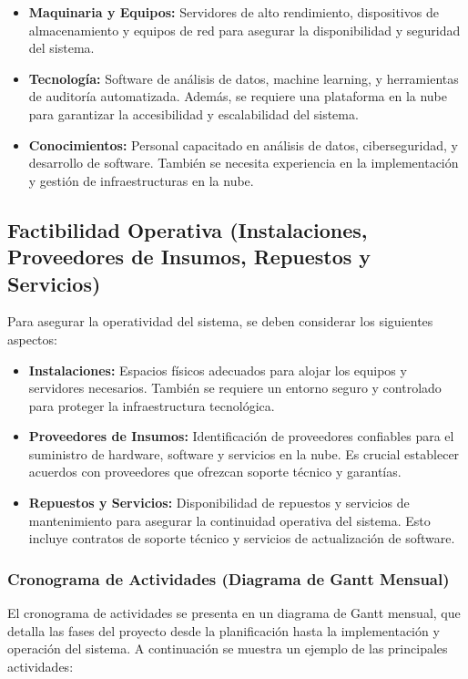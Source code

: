 \documentclass[a4paper,12pt]{article}
\begin{document}
\begin{itemize}
    \item \textbf{Maquinaria y Equipos:} Servidores de alto rendimiento, dispositivos de almacenamiento y equipos de red para asegurar la disponibilidad y seguridad del sistema.
    \item \textbf{Tecnología:} Software de análisis de datos, machine learning, y herramientas de auditoría automatizada. Además, se requiere una plataforma en la nube para garantizar la accesibilidad y escalabilidad del sistema.
    \item \textbf{Conocimientos:} Personal capacitado en análisis de datos, ciberseguridad, y desarrollo de software. También se necesita experiencia en la implementación y gestión de infraestructuras en la nube.
\end{itemize}

\subsection{Factibilidad Operativa (Instalaciones, Proveedores de Insumos, Repuestos y Servicios)}
Para asegurar la operatividad del sistema, se deben considerar los siguientes aspectos:

\begin{itemize}
    \item \textbf{Instalaciones:} Espacios físicos adecuados para alojar los equipos y servidores necesarios. También se requiere un entorno seguro y controlado para proteger la infraestructura tecnológica.
    \item \textbf{Proveedores de Insumos:} Identificación de proveedores confiables para el suministro de hardware, software y servicios en la nube. Es crucial establecer acuerdos con proveedores que ofrezcan soporte técnico y garantías.
    \item \textbf{Repuestos y Servicios:} Disponibilidad de repuestos y servicios de mantenimiento para asegurar la continuidad operativa del sistema. Esto incluye contratos de soporte técnico y servicios de actualización de software.
\end{itemize}

\subsubsection{Cronograma de Actividades (Diagrama de Gantt Mensual)}
El cronograma de actividades se presenta en un diagrama de Gantt mensual, que detalla las fases del proyecto desde la planificación hasta la implementación y operación del sistema. A continuación se muestra un ejemplo de las principales actividades:
\end{document}
